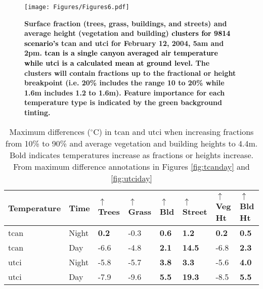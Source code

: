 \documentclass[final,3p,times,authoryear]{elsarticle}
\newcommand{\add}[1]{\textcolor{black}{#1}}
\newcommand{\remove}[1]{\textcolor{red}{\st{}}}
\begin{document}
\begin{figure*}
\centering
\texttt{[image: Figures/Figures6.pdf]}
\caption{\bf Surface fraction\remove{percentages} (trees, grass, buildings, and streets) and average height (vegetation and building) \remove{vs. }\add{clusters for 9814 scenario's} \gls{tcan} and \gls{utci} for February 12, 2004, 5am and 2pm. \add{\gls{tcan} is a single canyon averaged air temperature while \gls{utci} is a calculated mean at ground level.} The clusters will contain fractions up to the fractional or height breakpoint (i.e. 20\% includes the range 10 to 20\%  while 1.6m includes 1.2 to 1.6m). Feature importance for each temperature type is indicated by the green background tinting.}
 \label{fig:box5a} \label{fig:box14a}
\end{figure*} 


\begin{table}
\centering
\caption{\label{tab:tempDiffs}Maximum differences ($^{\circ}$C) in \gls{tcan} and \gls{utci} when increasing fractions from 10\% to 90\% and average vegetation and building heights to 4.4m. Bold indicates temperatures increase as fractions or heights increase. From maximum difference annotations in Figures \ref{fig:tcanday} and \ref{fig:utciday}}
\begin{tabular}{l l l l l l l l }
\hline
Temperature & Time & 
	$\uparrow$ Trees & 
	$\uparrow$ Grass & 
	$\uparrow$ Bld &
	$\uparrow$ Street &
	$\uparrow$ Veg Ht & 				
	$\uparrow$ Bld Ht 						
	\\
\hline
\gls{tcan} & Night &   
\textbf{0.2}&       %
-0.3& 				%
\textbf{0.6}&       %
\textbf{1.2} &       %
\textbf{0.2}&       %
\textbf{0.5}		%
\\
\gls{tcan} & Day &
-6.6&    	    %
-4.8&           %
\textbf{2.1}&   %
\textbf{14.5}&	%
-6.8&    	 	%
\textbf{2.3}   %
\\
\gls{utci} & Night &   
-5.8&         %
-5.7&         %
\textbf{3.8}& %
\textbf{3.3}&  %
-5.6&         %
\textbf{4.0}   %
\\
\gls{utci} & Day &	
-7.9&           %
-9.6&           %
\textbf{5.5}&   %
\textbf{19.3}&   %
-8.5&           %
\textbf{5.5}  %
\\
\end{tabular}
\end{table}
\end{document}
